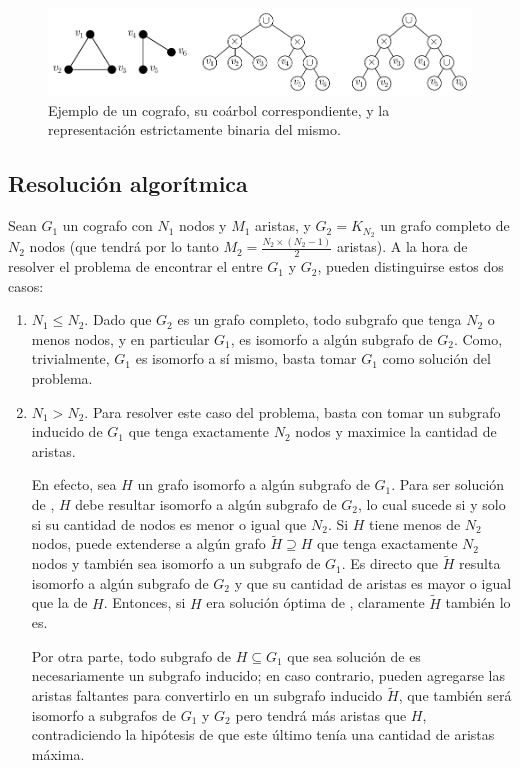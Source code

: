 \begin{figure}[htbp]
    \centering
    \includegraphics{imagenes/ex3_ejemplo-coarbol.pdf}
    \caption{Ejemplo de un cografo, su coárbol correspondiente, y la
    representación estrictamente binaria del mismo.}
    \label{fig:cografos:ejemplo-coarbol}
\end{figure}

\subsection{Resolución algorítmica}
Sean $G_1$ un cografo con $N_1$ nodos y $M_1$ aristas, y $G_2 = K_{N_2}$ un
grafo completo de $N_2$ nodos (que tendrá por lo tanto $M_2 = \frac{N_2 \times
(N_2 - 1)}{2}$ aristas). A la hora de resolver el problema de encontrar el
 entre $G_1$ y $G_2$, pueden distinguirse estos dos casos:
\begin{enumerate}
    \item $N_1 \leq N_2$. Dado que $G_2$ es un grafo completo, todo
    subgrafo que tenga $N_2$ o menos nodos, y en particular $G_1$,
    es isomorfo a algún subgrafo de $G_2$. Como, trivialmente, $G_1$ es
    isomorfo a sí mismo, basta tomar $G_1$ como solución del problema.
    \item $N_1 > N_2$. Para resolver este caso del problema, basta con
    tomar un subgrafo inducido de $G_1$ que tenga exactamente $N_2$ nodos y
    maximice la cantidad de aristas.

    En efecto, sea $H$ un grafo isomorfo a algún subgrafo de $G_1$. Para ser
    solución de , $H$ debe resultar isomorfo a algún subgrafo de
    $G_2$, lo cual sucede si y solo si su cantidad de nodos es menor o igual
    que $N_2$. Si $H$ tiene menos de $N_2$ nodos, puede extenderse a algún
    grafo $\tilde{H} \supseteq H$ que tenga exactamente $N_2$ nodos y también
    sea isomorfo a un subgrafo de $G_1$. Es directo que $\tilde{H}$ resulta
    isomorfo a algún subgrafo de $G_2$ y que su cantidad de aristas es mayor o
    igual que la de $H$. Entonces, si $H$ era solución óptima de
    , claramente $\tilde{H}$ también lo es.

    Por otra parte, todo subgrafo de $H \subseteq G_1$ que sea solución de
     es necesariamente un subgrafo inducido; en caso contrario,
    pueden agregarse las aristas faltantes para convertirlo en un subgrafo
    inducido $\tilde{H}$, que también será isomorfo a subgrafos de $G_1$ y
    $G_2$ pero tendrá más aristas que $H$, contradiciendo la hipótesis de que
    este último tenía una cantidad de aristas máxima.
\end{enumerate}

